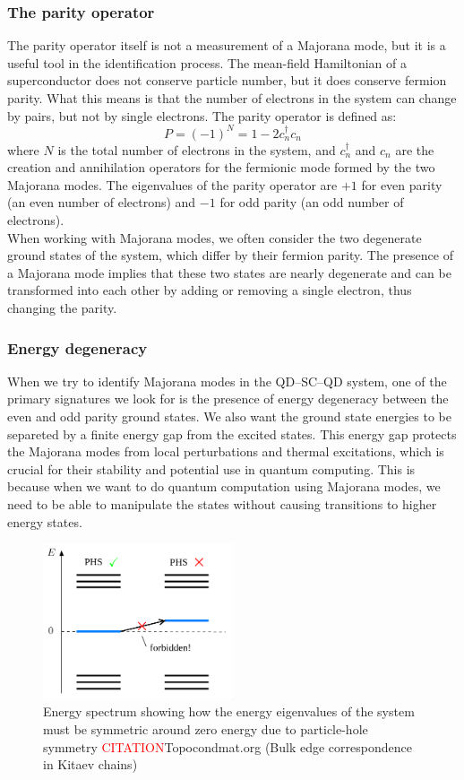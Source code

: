 \documentclass[11pt, letterpaper, titlepage]{article}
\begin{document}
\subsubsection{The parity operator}
The parity operator itself is not a measurement of a Majorana mode, but it is a useful tool in the identification process. The mean-field Hamiltonian of a superconductor does not conserve particle number, but it does conserve fermion parity. What this means is that the number of electrons in the system can change by pairs, but not by single electrons. The parity operator is defined as:
$$
P = (-1)^{N} = 1 - 2c_n ^{†} c_n
$$
where $N$ is the total number of electrons in the system, and $c_n^{†}$ and $c_n$ are the creation and annihilation operators for the fermionic mode formed by the two Majorana modes. The eigenvalues of the parity operator are $+1$ for even parity (an even number of electrons) and $-1$ for odd parity (an odd number of electrons).\\
When working with Majorana modes, we often consider the two degenerate ground states of the system, which differ by their fermion parity. The presence of a Majorana mode implies that these two states are nearly degenerate and can be transformed into each other by adding or removing a single electron, thus changing the parity.\\

\subsubsection{Energy degeneracy}
When we try to identify Majorana modes in the QD–SC–QD system, one of the primary signatures we look for is the presence of energy degeneracy between the even and odd parity ground states. We also want the ground state energies to be separeted by a finite energy gap from the excited states. This energy gap protects the Majorana modes from local perturbations and thermal excitations, which is crucial for their stability and potential use in quantum computing. This is because when we want to do quantum computation using Majorana modes, we need to be able to manipulate the states without causing transitions to higher energy states.\\
\begin{figure}
  \centering
  \includegraphics[width=0.5\textwidth]{../External_Figs/gs_symmetry.png}%
  \caption{Energy spectrum showing how the energy eigenvalues of the system must be symmetric around zero energy due to particle-hole symmetry \textcolor{red}{CITATION}Topocondmat.org (Bulk edge correspondence in Kitaev chains)}
  \label{fig:gs_symmetry}
\end{figure}
\newpage
\end{document}

